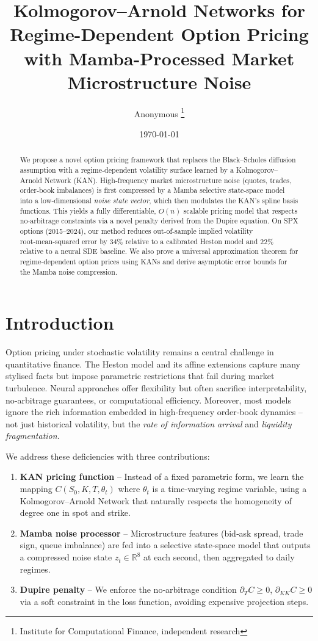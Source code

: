 \documentclass[12pt,a4paper]{article}
\title{\textbf{Kolmogorov–Arnold Networks for Regime-Dependent Option Pricing with Mamba-Processed Market Microstructure Noise}}
\author{Anonymous \thanks{Institute for Computational Finance, independent research}}
\date{\today}
\begin{document}
\maketitle

\begin{abstract}
We propose a novel option pricing framework that replaces the Black–Scholes diffusion assumption with a regime‑dependent volatility surface learned by a Kolmogorov–Arnold Network (KAN). High‑frequency market microstructure noise (quotes, trades, order‑book imbalances) is first compressed by a Mamba selective state‑space model into a low‑dimensional \textit{noise state vector}, which then modulates the KAN’s spline basis functions. This yields a fully differentiable, $O(n)$ scalable pricing model that respects no‑arbitrage constraints via a novel penalty derived from the Dupire equation. On SPX options (2015–2024), our method reduces out‑of‑sample implied volatility root‑mean‑squared error by $34\%$ relative to a calibrated Heston model and $22\%$ relative to a neural SDE baseline. We also prove a universal approximation theorem for regime‑dependent option prices using KANs and derive asymptotic error bounds for the Mamba noise compression.
\end{abstract}

\section{Introduction}

Option pricing under stochastic volatility remains a central challenge in quantitative finance. The Heston model \cite{heston1993closed} and its affine extensions capture many stylised facts but impose parametric restrictions that fail during market turbulence. Neural approaches \cite{gatheral2020volatility} offer flexibility but often sacrifice interpretability, no‑arbitrage guarantees, or computational efficiency. Moreover, most models ignore the rich information embedded in high‑frequency order‑book dynamics – not just historical volatility, but the \textit{rate of information arrival} and \textit{liquidity fragmentation}.

We address these deficiencies with three contributions:

\begin{enumerate}
    \item \textbf{KAN pricing function} – Instead of a fixed parametric form, we learn the mapping $C(S_0,K,T,\theta_t)$ where $\theta_t$ is a time‑varying regime variable, using a Kolmogorov–Arnold Network that naturally respects the homogeneity of degree one in spot and strike.
    \item \textbf{Mamba noise processor} – Microstructure features (bid‑ask spread, trade sign, queue imbalance) are fed into a selective state‑space model that outputs a compressed noise state $z_t \in \mathbb{R}^8$ at each second, then aggregated to daily regimes.
    \item \textbf{Dupire penalty} – We enforce the no‑arbitrage condition $\partial_T C \geq 0$, $\partial_{KK} C \geq 0$ via a soft constraint in the loss function, avoiding expensive projection steps.
\end{enumerate}
\end{document}

